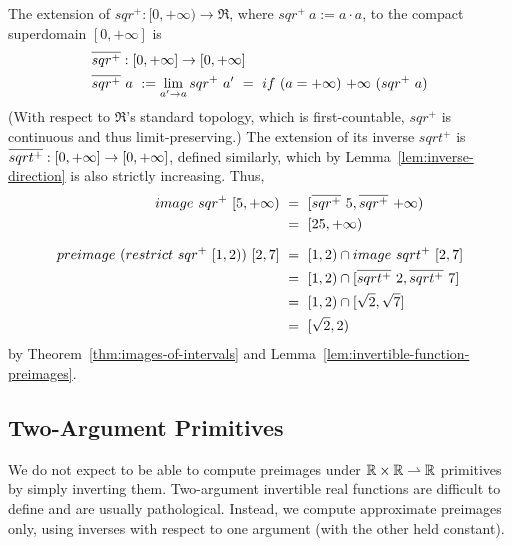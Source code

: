 \begin{example}
The extension of $sqr^+ : [0,+\infty) \to \Re$, where $sqr^+~a := a \cdot a$, to the compact superdomain $[0,+\infty]$ is
\begin{equation}
\begin{aligned}
	&\cl{sqr^+} : [0,+\infty] \to [0,+\infty] \\
	&	\cl{sqr^+}~a\ := \lim_{a' \to a} sqr^+~a'
		\ =\ if~(a = +\infty)~{+\infty}~(sqr^+~a)
\end{aligned}
\end{equation}
(With respect to $\Re$'s standard topology, which is first-countable, $sqr^+$ is continuous and thus limit-preserving.)
The extension of its inverse $sqrt^+$ is $\cl{sqrt^+} : [0,+\infty] \to [0,+\infty]$, defined similarly, which by Lemma~\ref{lem:inverse-direction} is also strictly increasing.
Thus,
\begin{equation}
\begin{aligned}
	image~sqr^+~[5,+\infty)\ &=\ [\cl{sqr^+}~5,\cl{sqr^+}~{+\infty})
\\
		\ &=\ [25,+\infty)
\\[6pt]
	preimage~(restrict~sqr^+~[1,2))~[2,7]
		\ &=\ [1,2) \i image~sqrt^+~[2,7]
\\
		\ &=\ [1,2) \i [\cl{sqrt^+}~2,\cl{sqrt^+}~7]
\\
		\ &=\ [1,2) \i [\sqrt{2},\sqrt{7}]
\\
		\ &=\ [\sqrt{2},2)
\end{aligned}
\end{equation}
by Theorem~\ref{thm:images-of-intervals} and Lemma~\ref{lem:invertible-function-preimages}.
\exampleqed
\end{example}


\subsection{Two-Argument Primitives}

We do not expect to be able to compute preimages under $\mathbb{R} \times \mathbb{R} \rightharpoonup \mathbb{R}$ primitives by simply inverting them.
Two-argument invertible real functions are difficult to define and are usually pathological.
Instead, we compute approximate preimages only, using inverses with respect to one argument (with the other held constant).

